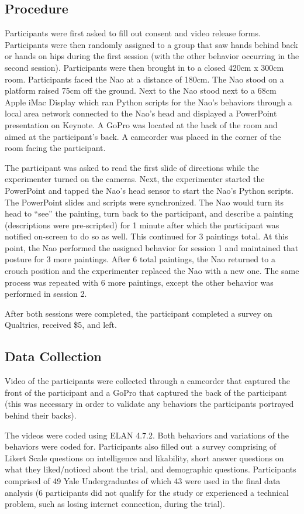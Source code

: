 \documentclass{acm_proc_article-sp}
\begin{document}
\subsection{Procedure}
Participants were first asked to fill out consent and video release forms. Participants were then randomly assigned to a group that saw hands behind back or hands on hips during the first session (with the other behavior occurring in the second session). Participants were then brought in to a closed 420cm x 300cm room. Participants faced the Nao at a distance of 180cm. The Nao stood on a platform raised 75cm off the ground. Next to the Nao stood next to a 68cm Apple iMac Display which ran Python scripts for the Nao's behaviors through a local area network connected to the Nao's head and displayed a PowerPoint presentation on Keynote. A GoPro was located at the back of the room and aimed at the participant's back. A camcorder was placed in the corner of the room facing the participant.

The participant was asked to read the first slide of directions while the experimenter turned on the cameras. Next, the experimenter started the PowerPoint and tapped the Nao's head sensor to start the Nao's Python scripts. The PowerPoint slides and scripts were synchronized. The Nao would turn its head to ``see'' the painting, turn back to the participant, and describe a painting (descriptions were pre-scripted) for 1 minute after which the participant was notified on-screen to do so as well. This continued for 3 paintings total. At this point, the Nao performed the assigned behavior for session 1 and maintained that posture for 3 more paintings. After 6 total paintings, the Nao returned to a crouch position and the experimenter replaced the Nao with a new one. The same process was repeated with 6 more paintings, except the other behavior was performed in session 2. 

After both sessions were completed, the participant completed a survey on Qualtrics, received \$5, and left.

\subsection{Data Collection}
Video of the participants were collected through a camcorder that captured the front of the participant and a GoPro that captured the back of the participant (this was necessary in order to validate any behaviors the participants portrayed behind their backs).

The videos were coded using ELAN 4.7.2. Both behaviors and variations of the behaviors were coded for. Participants also filled out a survey comprising of Likert Scale questions on intelligence and likability, short answer questions on what they liked/noticed about the trial, and demographic questions. Participants comprised of 49 Yale Undergraduates of which 43 were used in the final data analysis (6 participants did not qualify for the study or experienced a technical problem, such as losing internet connection, during the trial).
\end{document}
